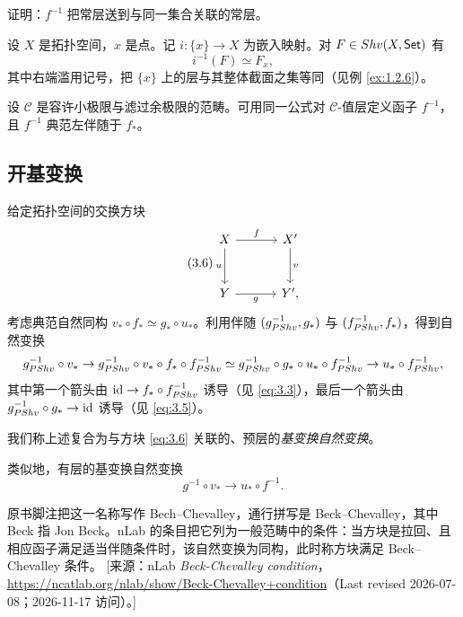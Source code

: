 \begin{exercise}\label{exc:3.4.6}
证明：$f^{-1}$ 把常层送到与同一集合关联的常层。
\end{exercise}

\begin{example}\label{ex:3.4.7}
设 $X$ 是拓扑空间，$x$ 是点。记 $i\colon\{x\}\to X$ 为嵌入映射。对 $F\in Shv(X,\mathsf{Set})$ 有
\[
i^{-1}(F)\simeq F_x,
\]
其中右端滥用记号，把 $\{x\}$ 上的层与其整体截面之集等同（见例 \ref{ex:1.2.6}）。
\end{example}

\begin{remark}\label{rem:3.4.8}
设 $\mathcal C$ 是容许小极限与滤过余极限的范畴。可用同一公式对 $\mathcal C$-值层定义函子 $f^{-1}$，且 $f^{-1}$ 典范左伴随于 $f_*$。
\end{remark}

\subsection{开基变换}\label{sec:3.5}

\begin{construction}\label{con:3.5.1}
给定拓扑空间的交换方块
\begin{equation}\tag{3.6}\label{eq:3.6}
\begin{tikzcd}[row sep=2.8em,column sep=3.2em]
X \arrow[r,"f"] \arrow[d,"u"'] & X' \arrow[d,"v"] \\
Y \arrow[r,"g"'] & Y',
\end{tikzcd}
\end{equation}
考虑典范自然同构 $v_*\circ f_*\simeq g_*\circ u_*$。利用伴随 $(g_{PShv}^{-1},g_*)$ 与 $(f_{PShv}^{-1},f_*)$，得到自然变换
\[
g_{PShv}^{-1}\circ v_*\to g_{PShv}^{-1}\circ v_*\circ f_*\circ f_{PShv}^{-1}\simeq g_{PShv}^{-1}\circ g_*\circ u_*\circ f_{PShv}^{-1}\to u_*\circ f_{PShv}^{-1},
\]
其中第一个箭头由 $\operatorname{id}\to f_*\circ f_{PShv}^{-1}$ 诱导（见 \eqref{eq:3.3}），最后一个箭头由 $g_{PShv}^{-1}\circ g_*\to\operatorname{id}$ 诱导（见 \eqref{eq:3.5}）。

我们称上述复合为与方块 \eqref{eq:3.6} 关联的、预层的\emph{基变换自然变换}。

类似地，有层的基变换自然变换
\[
g^{-1}\circ v_*\to u_*\circ f^{-1}.
\]
\end{construction}

\begin{yizhu}
原书脚注把这一名称写作 Bech--Chevalley，通行拼写是 Beck--Chevalley，其中 Beck 指 Jon Beck。nLab 的条目把它列为一般范畴中的条件：当方块是拉回、且相应函子满足适当伴随条件时，该自然变换为同构，此时称方块满足 Beck--Chevalley 条件。
[来源：nLab \emph{Beck-Chevalley condition}，\url{https://ncatlab.org/nlab/show/Beck-Chevalley+condition}（Last revised 2026-07-08；2026-11-17 访问）。]
\end{yizhu}
